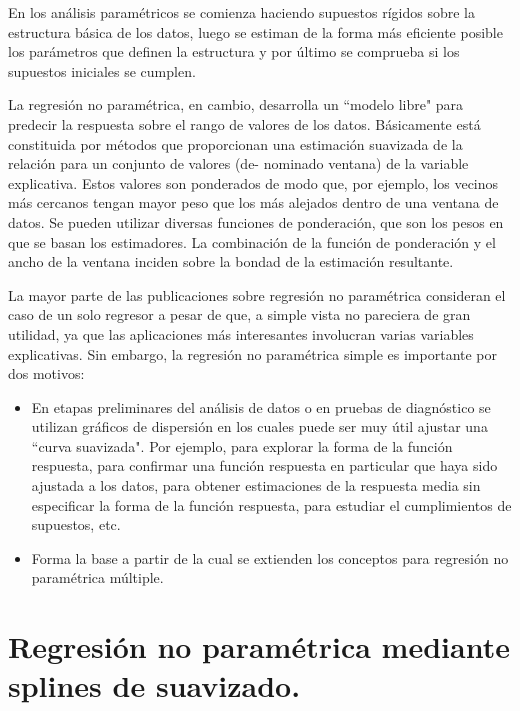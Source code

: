 \hspace{0.4cm}En los an\'alisis param\'etricos se comienza haciendo supuestos r\'igidos sobre la estructura b\'asica de los datos, luego se estiman de la forma m\'as eficiente posible los par\'ametros que definen la estructura y por \'ultimo se comprueba si los supuestos iniciales se cumplen.

\hspace{0.4cm}La regresi\'on no param\'etrica, en cambio, desarrolla un ``modelo libre" para predecir la respuesta sobre el rango de valores de los datos. B\'asicamente est\'a constituida por m\'etodos que proporcionan una estimaci\'on suavizada de la relaci\'on para un conjunto de valores (de- nominado ventana) de la variable explicativa. Estos valores son ponderados de modo que, por ejemplo, los vecinos m\'as cercanos tengan mayor peso que los m\'as alejados dentro de una ventana de datos. Se pueden utilizar diversas funciones de ponderaci\'on, que son los pesos en que se basan los estimadores. La combinaci\'on de la funci\'on de ponderaci\'on y el ancho de la ventana inciden sobre la bondad de la estimaci\'on resultante.


\hspace{0.4cm} La mayor parte de las publicaciones sobre regresi\'on no param\'etrica consideran el caso de un solo regresor a pesar de que, a simple vista no pareciera de gran utilidad, ya que las aplicaciones m\'as interesantes involucran varias variables explicativas. Sin embargo, la regresi\'on no param\'etrica simple es importante por dos motivos:


\begin{itemize}
  \item En etapas preliminares del an\'alisis de datos o en pruebas de diagn\'ostico se utilizan gr\'aficos de dispersi\'on en los cuales puede ser muy \'util ajustar una ``curva suavizada". Por ejemplo, para explorar la forma de la funci\'on respuesta, para confirmar una funci\'on respuesta en particular que haya sido ajustada a los datos, para obtener estimaciones de la respuesta media sin especificar la forma de la funci\'on respuesta, para estudiar el cumplimientos de supuestos, etc.
  \item Forma la base a partir de la cual se extienden los conceptos para regresi\'on no param\'etrica m\'ultiple.
\end{itemize}

\newpage

\section{Regresi\'on no param\'etrica mediante splines de suavizado.}

